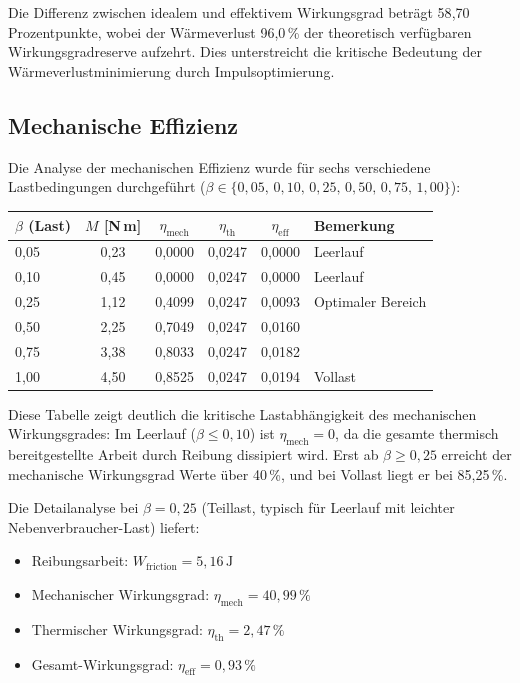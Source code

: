 ﻿\documentclass[a4paper,12pt]{article}
\begin{document}
Die Differenz zwischen idealem und effektivem Wirkungsgrad beträgt 58{,}70
Prozentpunkte, wobei der Wärmeverlust 96{,}0\,\% der theoretisch verfügbaren
Wirkungsgradreserve aufzehrt. Dies unterstreicht die kritische Bedeutung
der Wärmeverlustminimierung durch Impulsoptimierung.

\subsection{Mechanische Effizienz}

Die Analyse der mechanischen Effizienz wurde für sechs verschiedene Lastbedingungen
durchgeführt ($\beta \in \{0{,}05,\, 0{,}10,\, 0{,}25,\, 0{,}50,\, 0{,}75,\, 1{,}00\}$):

\begin{center}
\begin{tabular}{lccccl}
\toprule
$\beta$ (Last) & $M$ [N\,m] & $\eta_\text{mech}$ & $\eta_\text{th}$ & $\eta_\text{eff}$ & Bemerkung \\
\midrule
0{,}05 & 0{,}23 & 0{,}0000 & 0{,}0247 & 0{,}0000 & Leerlauf \\
0{,}10 & 0{,}45 & 0{,}0000 & 0{,}0247 & 0{,}0000 & Leerlauf \\
0{,}25 & 1{,}12 & 0{,}4099 & 0{,}0247 & 0{,}0093 & Optimaler Bereich \\
0{,}50 & 2{,}25 & 0{,}7049 & 0{,}0247 & 0{,}0160 & \\
0{,}75 & 3{,}38 & 0{,}8033 & 0{,}0247 & 0{,}0182 & \\
1{,}00 & 4{,}50 & 0{,}8525 & 0{,}0247 & 0{,}0194 & Vollast \\
\bottomrule
\end{tabular}
\end{center}

Diese Tabelle zeigt deutlich die kritische Lastabhängigkeit des mechanischen
Wirkungsgrades: Im Leerlauf ($\beta \leq 0{,}10$) ist $\eta_\text{mech} = 0$,
da die gesamte thermisch bereitgestellte Arbeit durch Reibung dissipiert wird.
Erst ab $\beta \geq 0{,}25$ erreicht der mechanische Wirkungsgrad Werte
über 40\,\%, und bei Vollast liegt er bei 85{,}25\,\%.

Die Detailanalyse bei $\beta = 0{,}25$ (Teillast, typisch für Leerlauf
mit leichter Nebenverbraucher-Last) liefert:

\begin{itemize}
  \item Reibungsarbeit: $W_\text{friction} = 5{,}16\,\text{J}$
  \item Mechanischer Wirkungsgrad: $\eta_\text{mech} = 40{,}99\,\%$
  \item Thermischer Wirkungsgrad: $\eta_\text{th} = 2{,}47\,\%$
  \item Gesamt-Wirkungsgrad: $\eta_\text{eff} = 0{,}93\,\%$
\end{itemize}
\end{document}
